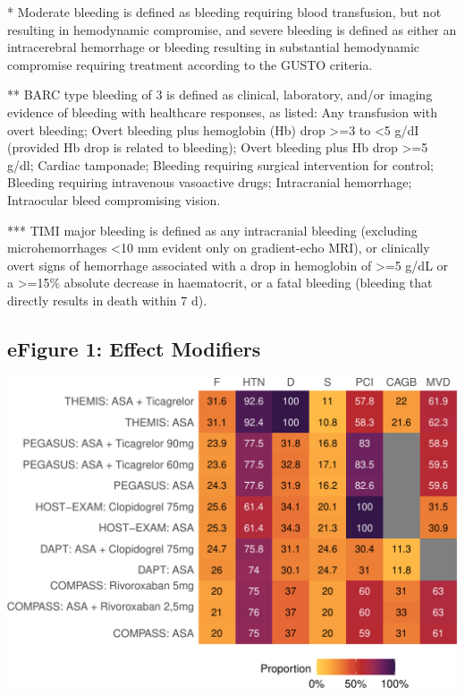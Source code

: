 \documentclass[
  12pt,
]{article}
\begin{document}
\footnotesize

* Moderate bleeding is defined as bleeding requiring blood transfusion,
but not resulting in hemodynamic compromise, and severe bleeding is
defined as either an intracerebral hemorrhage or bleeding resulting in
substantial hemodynamic compromise requiring treatment according to the
GUSTO criteria.

** BARC type bleeding of 3 is defined as clinical, laboratory, and/or
imaging evidence of bleeding with healthcare responses, as listed: Any
transfusion with overt bleeding; Overt bleeding plus hemoglobin (Hb)
drop \textgreater=3 to \textless5 g/dI (provided Hb drop is related to
bleeding); Overt bleeding plus Hb drop \textgreater=5 g/dl; Cardiac
tamponade; Bleeding requiring surgical intervention for control;
Bleeding requiring intravenous vasoactive drugs; Intracranial
hemorrhage; Intraocular bleed compromising vision.

*** TIMI major bleeding is defined as any intracranial bleeding
(excluding microhemorrhages \textless10 mm evident only on gradient-echo
MRI), or clinically overt signs of hemorrhage associated with a drop in
hemoglobin of \textgreater=5 g/dL or a \textgreater=15\% absolute
decrease in haematocrit, or a fatal bleeding (bleeding that directly
results in death within 7 d).

\normalsize

\hypertarget{efigure-1-effect-modifiers}{%
\subsection{eFigure 1: Effect
Modifiers}\label{efigure-1-effect-modifiers}}

\begin{center}\includegraphics{03_supplementary_files/figure-latex/unnamed-chunk-4-1} \end{center}
\end{document}
